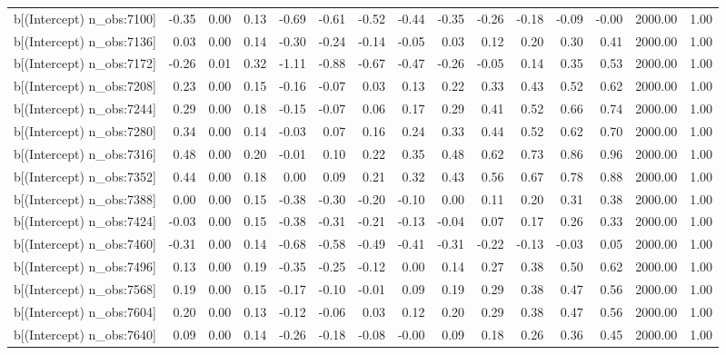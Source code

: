 \begin{table}[ht]
\begin{tabular}{rrrrrrrrrrrrrrr}
  b[(Intercept) n\_obs:7100] & -0.35 & 0.00 & 0.13 & -0.69 & -0.61 & -0.52 & -0.44 & -0.35 & -0.26 & -0.18 & -0.09 & -0.00 & 2000.00 & 1.00 \\ 
  b[(Intercept) n\_obs:7136] & 0.03 & 0.00 & 0.14 & -0.30 & -0.24 & -0.14 & -0.05 & 0.03 & 0.12 & 0.20 & 0.30 & 0.41 & 2000.00 & 1.00 \\ 
  b[(Intercept) n\_obs:7172] & -0.26 & 0.01 & 0.32 & -1.11 & -0.88 & -0.67 & -0.47 & -0.26 & -0.05 & 0.14 & 0.35 & 0.53 & 2000.00 & 1.00 \\ 
  b[(Intercept) n\_obs:7208] & 0.23 & 0.00 & 0.15 & -0.16 & -0.07 & 0.03 & 0.13 & 0.22 & 0.33 & 0.43 & 0.52 & 0.62 & 2000.00 & 1.00 \\ 
  b[(Intercept) n\_obs:7244] & 0.29 & 0.00 & 0.18 & -0.15 & -0.07 & 0.06 & 0.17 & 0.29 & 0.41 & 0.52 & 0.66 & 0.74 & 2000.00 & 1.00 \\ 
  b[(Intercept) n\_obs:7280] & 0.34 & 0.00 & 0.14 & -0.03 & 0.07 & 0.16 & 0.24 & 0.33 & 0.44 & 0.52 & 0.62 & 0.70 & 2000.00 & 1.00 \\ 
  b[(Intercept) n\_obs:7316] & 0.48 & 0.00 & 0.20 & -0.01 & 0.10 & 0.22 & 0.35 & 0.48 & 0.62 & 0.73 & 0.86 & 0.96 & 2000.00 & 1.00 \\ 
  b[(Intercept) n\_obs:7352] & 0.44 & 0.00 & 0.18 & 0.00 & 0.09 & 0.21 & 0.32 & 0.43 & 0.56 & 0.67 & 0.78 & 0.88 & 2000.00 & 1.00 \\ 
  b[(Intercept) n\_obs:7388] & 0.00 & 0.00 & 0.15 & -0.38 & -0.30 & -0.20 & -0.10 & 0.00 & 0.11 & 0.20 & 0.31 & 0.38 & 2000.00 & 1.00 \\ 
  b[(Intercept) n\_obs:7424] & -0.03 & 0.00 & 0.15 & -0.38 & -0.31 & -0.21 & -0.13 & -0.04 & 0.07 & 0.17 & 0.26 & 0.33 & 2000.00 & 1.00 \\ 
  b[(Intercept) n\_obs:7460] & -0.31 & 0.00 & 0.14 & -0.68 & -0.58 & -0.49 & -0.41 & -0.31 & -0.22 & -0.13 & -0.03 & 0.05 & 2000.00 & 1.00 \\ 
  b[(Intercept) n\_obs:7496] & 0.13 & 0.00 & 0.19 & -0.35 & -0.25 & -0.12 & 0.00 & 0.14 & 0.27 & 0.38 & 0.50 & 0.62 & 2000.00 & 1.00 \\ 
  b[(Intercept) n\_obs:7568] & 0.19 & 0.00 & 0.15 & -0.17 & -0.10 & -0.01 & 0.09 & 0.19 & 0.29 & 0.38 & 0.47 & 0.56 & 2000.00 & 1.00 \\ 
  b[(Intercept) n\_obs:7604] & 0.20 & 0.00 & 0.13 & -0.12 & -0.06 & 0.03 & 0.12 & 0.20 & 0.29 & 0.38 & 0.47 & 0.56 & 2000.00 & 1.00 \\ 
  b[(Intercept) n\_obs:7640] & 0.09 & 0.00 & 0.14 & -0.26 & -0.18 & -0.08 & -0.00 & 0.09 & 0.18 & 0.26 & 0.36 & 0.45 & 2000.00 & 1.00 \\ 

\end{tabular}
\end{table}
